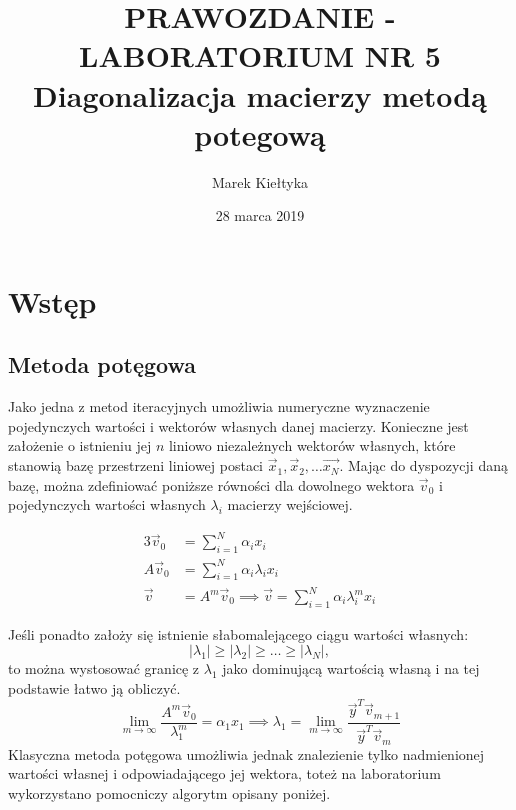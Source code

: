 

\title{\Large\vspace{-2.5cm}{\Huge S}PRAWOZDANIE - LABORATORIUM NR {\Huge5}\\
		\textbf{Diagonalizacja macierzy metodą potegową} } 
\date{\Large28 marca 2019}
\author{\Large Marek Kiełtyka}


\maketitle

\vspace{-1.2cm}\section{Wstęp}
	
\subsection{Metoda potęgowa}

Jako jedna z metod iteracyjnych umożliwia numeryczne wyznaczenie pojedynczych wartości i wektorów własnych danej macierzy. Konieczne jest założenie o istnieniu jej $n$ liniowo niezależnych wektorów własnych, które stanowią bazę przestrzeni liniowej postaci $ \vec{x}_1, \vec{x}_2, \dots \vec{x_N} $. Mając do dyspozycji daną bazę, można zdefiniować poniższe równości dla dowolnego wektora $\vec{v}_0$ i pojedynczych wartości własnych $\lambda_i$ macierzy wejściowej.

\begin{alignat*}{3}
\vec{v}_0 &= \sum_{i=1}^N \alpha_i x_i \\
A\vec{v}_0 &= \sum_{i=1}^N \alpha_i \lambda_i x_i \\
\vec{v} &= A^m \vec{v}_0 \implies \vec{v} = \sum_{i=1}^N \alpha_i \lambda_i^m x_i
\end{alignat*}

Jeśli ponadto założy się istnienie słabomalejącego ciągu wartości własnych: 
\begin{equation}
|\lambda_1 | \geq |\lambda_2| \geq \dots \geq |\lambda_N|,
\end{equation}
to można wystosować granicę z $\lambda_1$ jako dominującą wartością własną i na tej podstawie łatwo ją obliczyć.
\begin{equation}
\lim_{m \rightarrow \infty} \frac{A^m \vec{v}_0}{\lambda_1^m} = \alpha_1 x_1 \implies \lambda_1 = \lim_{m \rightarrow \infty} \frac{\vec{y}^T \vec{v}_{m+1}}{\vec{y}^T \vec{v}_m}
\end{equation}
Klasyczna metoda potęgowa umożliwia jednak znalezienie tylko nadmienionej wartości własnej i odpowiadającego jej wektora, toteż na laboratorium wykorzystano pomocniczy algorytm opisany poniżej.
 
